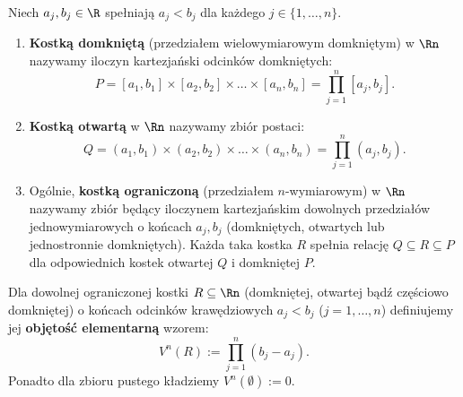 \begin{defi}[Kostka w $\Rn$]
    Niech $a_j, b_j \in \R$ spełniają $a_j < b_j$ dla każdego $j \in \{1, \ldots, n\}$.

    \begin{enumerate}
        \item \textbf{Kostką domkniętą} (przedziałem wielowymiarowym domkniętym) w $\Rn$ nazywamy iloczyn kartezjański odcinków domkniętych:
              \begin{equation*} P = [a_1, b_1] \times [a_2, b_2] \times \ldots \times [a_n, b_n] = \prod_{j=1}^n [a_j, b_j].
              \end{equation*}
        \item \textbf{Kostką otwartą} w $\Rn$ nazywamy zbiór postaci:
              \begin{equation*} Q = (a_1, b_1) \times (a_2, b_2) \times \ldots \times (a_n, b_n) = \prod_{j=1}^n (a_j, b_j).
              \end{equation*}
        \item Ogólnie, \textbf{kostką ograniczoną} (przedziałem $n$-wymiarowym) w $\Rn$ nazywamy zbiór będący iloczynem kartezjańskim dowolnych przedziałów jednowymiarowych o końcach $a_j, b_j$ (domkniętych, otwartych lub jednostronnie domkniętych). Każda taka kostka $R$ spełnia relację $Q \subseteq  R \subseteq  P$ dla odpowiednich kostek otwartej $Q$ i domkniętej $P$.
    \end{enumerate}
\end{defi}

\begin{defi} Dla dowolnej ograniczonej kostki $R \subseteq \Rn$ (domkniętej, otwartej bądź częściowo domkniętej) o końcach odcinków krawędziowych $a_j < b_j$ ($j = 1, \ldots, n$) definiujemy jej \textbf{objętość elementarną} wzorem:
    \begin{equation*}
        V^n(R) := \prod_{j=1}^n (b_j - a_j).
    \end{equation*}
    Ponadto dla zbioru pustego kładziemy $V^n(\emptyset) := 0$.
\end{defi}

